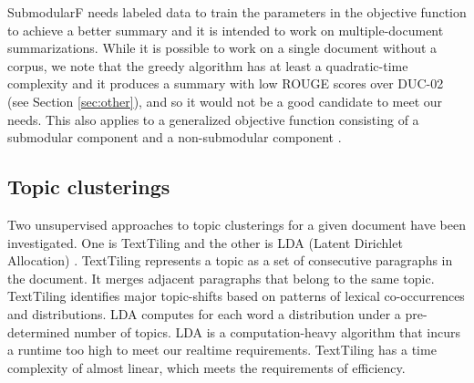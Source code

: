 \documentclass[a4paper,twoside]{article}
\begin{document}
SubmodularF needs labeled data to train the parameters in the objective function to achieve a better summary and it is intended to work on multiple-document summarizations.
While it is possible to work on a single document without a corpus, we note that the greedy algorithm has at least a quadratic-time complexity and it produces a summary with
low ROUGE scores over DUC-02 (see Section \ref{sec:other}),
and so it would not be a good candidate to meet our needs. This also applies to a generalized objective function
%
%
%
consisting of a submodular component and a non-submodular component \cite{DasguptaKR13}.

\subsection{Topic clusterings}

Two unsupervised approaches to topic clusterings for a given document have been investigated.
One is TextTiling \cite{hearst:97} and the other is LDA (Latent Dirichlet Allocation) \cite{blei:03}.
TextTiling %
represents a topic as a set of consecutive paragraphs in the document.
It merges adjacent paragraphs that belong to the same topic. TextTiling identifies major topic-shifts based on patterns of lexical co-occurrences and distributions.
LDA computes for each word a distribution under a pre-determined number of topics. %
LDA is a computation-heavy algorithm
that incurs a runtime too high to meet our realtime requirements.
TextTiling has a time complexity of almost linear, which meets the requirements of efficiency. %
\end{document}

